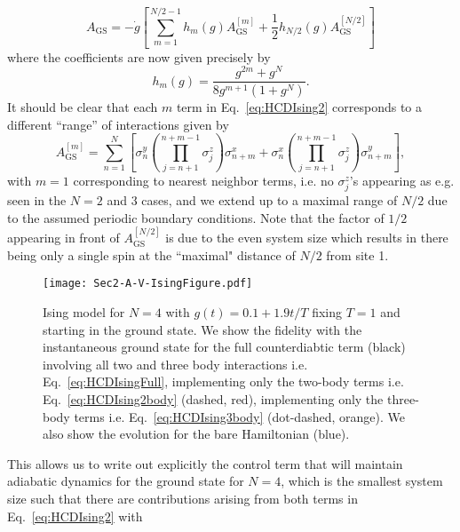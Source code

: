 \begin{equation}
\label{eq:HCDIsing2}
A_\text{GS}=-\dot{g} \left[\sum_{m=1}^{N/2-1} h_{m}(g) A_\text{GS}^{[m]} + \frac{1}{2}h_{N/2}(g) A_\text{GS}^{[N/2]} \right]    
\end{equation}
where the coefficients are now given precisely by
\begin{equation}
h_m(g) = \frac{g^{2m}+g^N}{8g^{m+1}(1+g^N)}.
\end{equation}
It should be clear that each $m$ term in Eq.~\eqref{eq:HCDIsing2} corresponds to a different ``range'' of interactions given by
\begin{equation}
A_\text{GS}^{[m]} = \sum_{n=1}^{N} \left[ \sigma^y_n \left( \prod_{j=n+1}^{n+m-1} \sigma^z_j \right) \sigma^x_{n+m} + \sigma^x_n \left( \prod_{j=n+1}^{n+m-1} \sigma^z_j \right) \sigma^y_{n+m} \right],
\end{equation}
with $m=1$ corresponding to nearest neighbor terms, i.e. no $\sigma^z_j$'s appearing as e.g. seen in the $N=2$ and 3 cases, and we extend up to a maximal range of $N/2$ due to the assumed periodic boundary conditions. Note that the factor of $1/2$ appearing in front of $A_\text{GS}^{[N/2]}$ is due to the even system size which results in there being only a single spin at the ``maximal" distance of $N/2$ from site 1. 
\begin{figure}[t]
\texttt{[image: Sec2-A-V-IsingFigure.pdf]}
\caption{Ising model for $N=4$ with $g(t)=0.1+1.9 t/T$ fixing $T \!=\!1$ and starting in the ground state. We show the fidelity with the instantaneous ground state for the full counterdiabtic term (black) involving all two and three body interactions i.e. Eq.~\eqref{eq:HCDIsingFull}, implementing only the two-body terms i.e. Eq.~\eqref{eq:HCDIsing2body} (dashed, red), implementing only the three-body terms i.e. Eq.~\eqref{eq:HCDIsing3body} (dot-dashed, orange). We also show the evolution for the bare Hamiltonian (blue).}
\label{IsingFig}
\end{figure}
This allows us to write out explicitly the control term that will maintain adiabatic dynamics for the ground state for $N=4$, which is the smallest system size such that there are contributions arising from both terms in Eq.~\eqref{eq:HCDIsing2} with 
